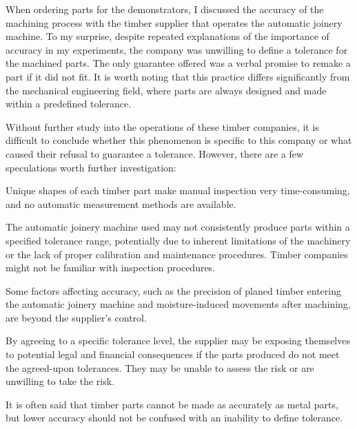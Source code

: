 When ordering parts for the demonstrators, I discussed the accuracy of the machining process with the timber supplier that operates the automatic joinery machine. To my surprise, despite repeated explanations of the importance of accuracy in my experiments, the company was unwilling to define a tolerance for the machined parts. The only guarantee offered was a verbal promise to remake a part if it did not fit. It is worth noting that this practice differs significantly from the mechanical engineering field, where parts are always designed and made within a predefined tolerance. 

Without further study into the operations of these timber companies, it is difficult to conclude whether this phenomenon is specific to this company or what caused their refusal to guarantee a tolerance. However, there are a few speculations worth further investigation:

\begin{description}[style=unboxed] %

	\item [Economic considerations] Unique shapes of each timber part make manual inspection very time-consuming, and no automatic measurement methods are available.

	\item [Limited capabilities] The automatic joinery machine used may not consistently produce parts within a specified tolerance range, potentially due to inherent limitations of the machinery or the lack of proper calibration and maintenance procedures. Timber companies might not be familiar with inspection procedures.

	\item [Industry norms] Some factors affecting accuracy, such as the precision of planed timber entering the automatic joinery machine and moisture-induced movements after machining, are beyond the supplier's control.

	\item [Liability concerns] By agreeing to a specific tolerance level, the supplier may be exposing themselves to potential legal and financial consequences if the parts produced do not meet the agreed-upon tolerances. They may be unable to assess the risk or are unwilling to take the risk.

\end{description}
It is often said that timber parts cannot be made as accurately as metal parts, but lower accuracy should not be confused with an inability to define tolerance. 

